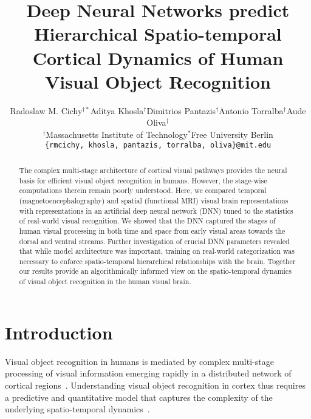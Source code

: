 \documentclass[10pt,twocolumn,letterpaper]{article}
\begin{document}
\title{Deep Neural Networks predict Hierarchical Spatio-temporal Cortical Dynamics of Human Visual Object Recognition}

\author{Radoslaw M. Cichy$^{\dagger *}$\hspace*{5mm}Aditya Khosla$^\dagger$\hspace*{5mm}Dimitrios Pantazis$^\dagger$\hspace*{5mm}Antonio Torralba$^\dagger$\hspace*{5mm}Aude Oliva$^\dagger$\\
$^\dagger$Massachusetts Institute of Technology\hspace*{8mm}$^*$Free University Berlin\\
{\tt\small \{rmcichy, khosla, pantazis, torralba, oliva\}@mit.edu}
}

\maketitle

\begin{abstract}
The complex multi-stage architecture of cortical visual pathways provides the neural basis for efficient visual object recognition in humans. However, the stage-wise computations therein remain poorly understood. Here, we compared temporal (magnetoencephalography) and spatial (functional MRI) visual brain representations with representations in an artificial deep neural network (DNN) tuned to the statistics of real-world visual recognition. We showed that the DNN captured the stages of human visual processing in both time and space from early visual areas towards the dorsal and ventral streams. Further investigation of crucial DNN parameters revealed that while model architecture was important, training on real-world categorization was necessary to enforce spatio-temporal hierarchical relationships with the brain. Together our results provide an algorithmically informed view on the spatio-temporal dynamics of visual object recognition in the human visual brain.
\end{abstract}

\section{Introduction}
Visual object recognition in humans is mediated by complex multi-stage processing of visual information emerging rapidly in a distributed network of cortical regions~\cite{goodale1982analysis,felleman1991distributed,bullier2001integrated,milner1995visual,kourtzi2011neural,kravitz2011new,dicarlo2012does}. Understanding visual object recognition in cortex thus requires a predictive and quantitative model that captures the complexity of the underlying spatio-temporal dynamics~\cite{riesenhuber1999hierarchical,riesenhuber2002neural,naselaris2009bayesian}.
\end{document}

